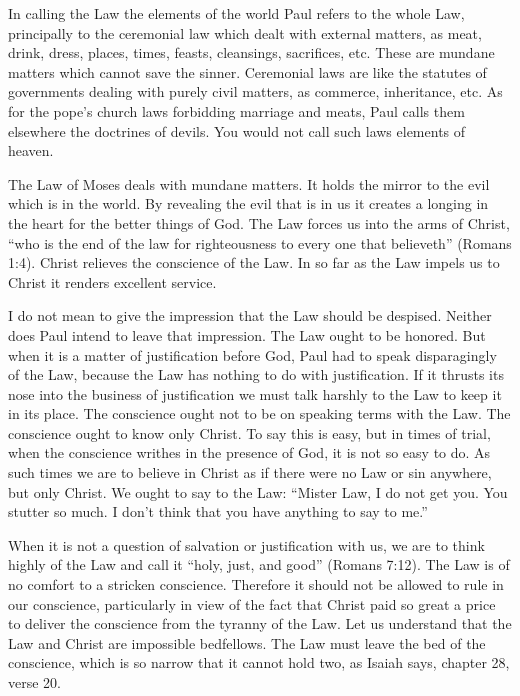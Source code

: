 In calling the Law the elements of the world Paul refers to the whole Law, principally to the ceremonial law which dealt with external matters, as meat, drink, dress, places, times, feasts, cleansings, sacrifices, etc. These are mundane matters which cannot save the sinner. Ceremonial laws are like the statutes of governments dealing with purely civil matters, as commerce, inheritance, etc. As for the pope’s church laws forbidding marriage and meats, Paul calls them elsewhere the doctrines of devils. You would not call such laws elements of heaven.

The Law of Moses deals with mundane matters. It holds the mirror to the evil which is in the world. By revealing the evil that is in us it creates a longing in the heart for the better things of God. The Law forces us into the arms of Christ, “who is the end of the law for righteousness to every one that believeth” (Romans 1:4). Christ relieves the conscience of the Law. In so far as the Law impels us to Christ it renders excellent service.

I do not mean to give the impression that the Law should be despised. Neither does Paul intend to leave that impression. The Law ought to be honored. But when it is a matter of justification before God, Paul had to speak disparagingly of the Law, because the Law has nothing to do with justification. If it thrusts its nose into the business of justification we must talk harshly to the Law to keep it in its place. The conscience ought not to be on speaking terms with the Law. The conscience ought to know only Christ. To say this is easy, but in times of trial, when the conscience writhes in the presence of God, it is not so easy to do. As such times we are to believe in Christ as if there were no Law or sin anywhere, but only Christ. We ought to say to the Law: “Mister Law, I do not get you. You stutter so much. I don’t think that you have anything to say to me.”

When it is not a question of salvation or justification with us, we are to think highly of the Law and call it “holy, just, and good” (Romans 7:12). The Law is of no comfort to a stricken conscience. Therefore it should not be allowed to rule in our conscience, particularly in view of the fact that Christ paid so great a price to deliver the conscience from the tyranny of the Law. Let us understand that the Law and Christ are impossible bedfellows. The Law must leave the bed of the conscience, which is so narrow that it cannot hold two, as Isaiah says, chapter 28, verse 20.

